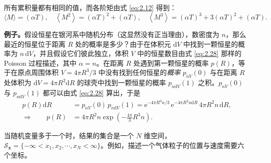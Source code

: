 所有累积量都有相同的值，而各阶矩由式 \eqref{eq:2.12} 得到：
\begin{equation}\label{eq:2.30}
  \langle M\rangle=(\alpha T),\quad \left\langle M^2\right\rangle=(\alpha T)^2+(\alpha T),\quad \left\langle M^3\right\rangle=(\alpha T)^3+3(\alpha T)^2+(\alpha T).
\end{equation}

\textbf{例子。}假设恒星在银河系中随机分布（这显然没有正当理由），数密度为 $n$，那么最近的恒星位于距离 $R$ 处的概率是多少？由于在体积元 $\mathrm{d}V$ 中找到一颗恒星的概率为 $n\,\mathrm{d}V$，并且假设它们彼此独立，体积 $V$ 中的恒星数目由式 \eqref{eq:2.28} 那样的 Poisson 过程描述，其中 $\alpha=n$。在距离 $R$ 处遇到第一颗恒星的概率 $p(R)$，等于在原点周围体积 $V=4\pi R^3/3$ 中没有找到任何恒星的\emph{概率} $p_{nV}(0)$ 与在距离 $R$ 处体积为 $\mathrm{d}V=4\pi R^2\mathrm{d}R$ 的球壳中找到一颗恒星的概率 $p_{n\mathrm{d}V}(1)$ 之积。$p_{nV}(0)$ 与 $p_{n\mathrm{d}V}(1)$ 都可以由式 \eqref{eq:2.28} 算出，于是
\begin{equation}\label{eq:2.31}
  \begin{aligned}
    p(R)\mathrm{d}R&=p_{nV}(0)\,p_{n\mathrm{d}V}(1)=\mathrm{e}^{-4\pi R^3n/3}\,\mathrm{e}^{-4\pi R^2n\mathrm{d}R}\,4\pi R^2n\,\mathrm{d}R,\\[2pt]
    \Longrightarrow\qquad p(R)&=4\pi R^2n\exp\left(-\frac{4\pi}{3}R^3n\right).
  \end{aligned}
\end{equation}


当随机变量多于一个时，结果的集合是一个 $N$ 维空间，$\mathscr{S}_{\bm{x}}=\{-\infty<x_1,x_2,\cdots,x_N<\infty\}$。例如，描述一个气体粒子的位置与速度需要六个坐标。

